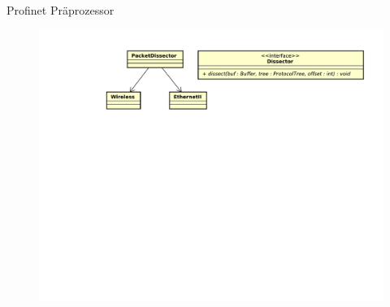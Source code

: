 \begin{frame}{Profinet Präprozessor}
    \begin{figure}
    	\centering
    	\includegraphics[width=\textwidth]{./images/dissector/3.pdf}
    \end{figure}
\end{frame}
